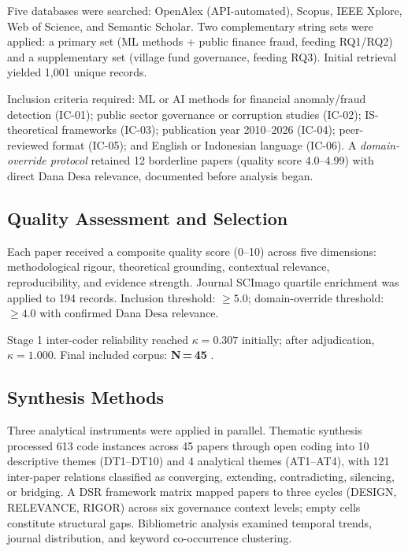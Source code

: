 \documentclass[3p,times,procedia]{elsarticle}
\begin{document}
Five databases were searched: OpenAlex (API-automated), Scopus, IEEE Xplore, Web of
Science, and Semantic Scholar. Two complementary string sets were applied: a primary
set (ML methods + public finance fraud, feeding RQ1/RQ2) and a supplementary set (village
fund governance, feeding RQ3). Initial retrieval yielded 1,001 unique records.

Inclusion criteria required: ML or AI methods for financial anomaly/fraud detection
(IC-01); public sector governance or corruption studies (IC-02); IS-theoretical frameworks
(IC-03); publication year 2010--2026 (IC-04); peer-reviewed format (IC-05); and English
or Indonesian language (IC-06). A \textit{domain-override protocol} retained 12 borderline
papers (quality score 4.0--4.99) with direct Dana Desa relevance, documented before
analysis began.

\subsection{Quality Assessment and Selection}

Each paper received a composite quality score (0--10) across five dimensions:
methodological rigour, theoretical grounding, contextual relevance, reproducibility, and
evidence strength. Journal SCImago quartile enrichment was applied to 194 records.
Inclusion threshold: $\geq 5.0$; domain-override threshold: $\geq 4.0$ with confirmed
Dana Desa relevance.

Stage 1 inter-coder reliability reached $\kappa = 0.307$ initially; after adjudication,
$\kappa = 1.000$. Final included corpus: \textbf{N\,=\,45}
\cite{p001,p002,p003,p004,p005,p006,p007,p008,p009,p010,p011,p012,p013,p014,p015,
p016,p017,p018,p019,p020,p021,p022,p023,p024,p025,p026,p027,p028,p029,p030,
p031,p032,p033,p034,p035,p036,p037,p038,p039,p040,p041,p042,p043,p044,p045}.

\subsection{Synthesis Methods}

Three analytical instruments were applied in parallel. Thematic synthesis
\cite{method_thomas2008} processed 613 code instances across 45 papers through open
coding into 10 descriptive themes (DT1--DT10) and 4 analytical themes (AT1--AT4),
with 121 inter-paper relations classified as converging, extending, contradicting,
silencing, or bridging. A DSR framework matrix \cite{method_hevner2004} mapped papers to
three cycles (DESIGN, RELEVANCE, RIGOR) across six governance context levels; empty
cells constitute structural gaps. Bibliometric analysis \cite{method_donthu2021} examined
temporal trends, journal distribution, and keyword co-occurrence clustering.
\end{document}
